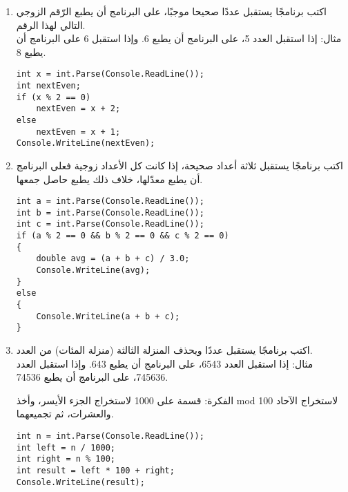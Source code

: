 ﻿\documentclass[12pt]{article}
\begin{document}
\begin{enumerate}[itemsep=2em]
\item
اكتب برنامجًا يستقبل عددًا صحيحا موجبًا، على البرنامج أن يطبع الرّقم الزوجي التالي لهذا الرقم.\\
مثال: إذا استقبل العدد 5، على البرنامج أن يطبع 6. وإذا استقبل 6 على البرنامج أن يطبع 8.

\ifwithsols
\begin{boxSolution}
\begin{english}
\begin{verbatim}
int x = int.Parse(Console.ReadLine());
int nextEven;
if (x % 2 == 0)
    nextEven = x + 2;
else
    nextEven = x + 1;
Console.WriteLine(nextEven);
\end{verbatim}
\end{english}
\end{boxSolution}
\fi


\item
اكتب برنامجًا يستقبل ثلاثة أعداد صحيحة، إذا كانت كل الأعداد زوجية فعلى البرنامج أن يطبع معدّلها، خلاف ذلك يطبع حاصل جمعها.

\ifwithsols
\begin{boxSolution}
\begin{english}
\begin{verbatim}
int a = int.Parse(Console.ReadLine());
int b = int.Parse(Console.ReadLine());
int c = int.Parse(Console.ReadLine());
if (a % 2 == 0 && b % 2 == 0 && c % 2 == 0)
{
    double avg = (a + b + c) / 3.0;
    Console.WriteLine(avg);
}
else
{
    Console.WriteLine(a + b + c);
}
\end{verbatim}
\end{english}
\end{boxSolution}
\fi


\item
اكتب برنامجًا يستقبل عددًا ويحذف المنزلة الثالثة (منزلة المئات) من العدد.\\
مثال: إذا استقبل العدد 6543، على البرنامج أن يطبع 643. وإذا استقبل العدد 745636، على البرنامج أن يطبع 74536.

\ifwithsols
\begin{boxSolution}
الفكرة: قسمة على 1000 لاستخراج الجزء الأيسر، وأخذ \textenglish{mod 100} لاستخراج الآحاد والعشرات، ثم تجميعهما.
\begin{english}
\begin{verbatim}
int n = int.Parse(Console.ReadLine());
int left = n / 1000;
int right = n % 100;
int result = left * 100 + right;
Console.WriteLine(result);
\end{verbatim}
\end{english}
\end{boxSolution}
\fi



\end{enumerate}
\end{document}
